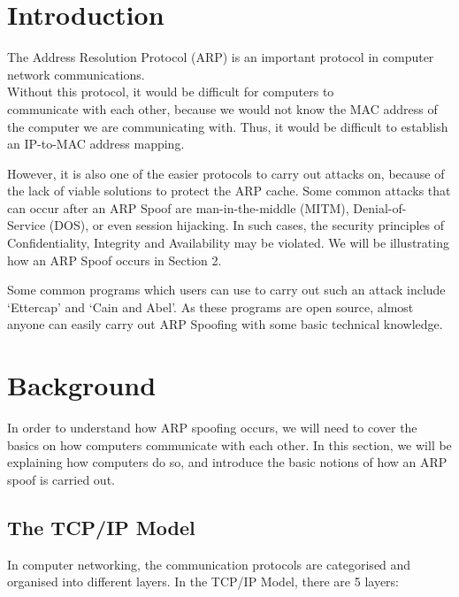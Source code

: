 \documentclass{acm_proc_article-sp}
\begin{document}


\section{Introduction}
The Address Resolution Protocol (ARP) is an important protocol in computer network communications. \\ Without this protocol, it would be difficult for computers to \\communicate with each other, because we would not know the MAC address of the computer we are communicating with. Thus, it would be difficult to establish an IP-to-MAC address mapping.

However, it is also one of the easier protocols to carry out attacks on, because of the lack of viable solutions to protect the ARP cache. Some common attacks that can occur after an ARP Spoof are man-in-the-middle (MITM), Denial-of-\\Service (DOS), or even session hijacking. 
In such cases, the security principles of Confidentiality, Integrity and Availability may be violated. 
We will be illustrating how an ARP Spoof occurs in Section 2. 

Some common programs which users can use to carry out such an attack include `Ettercap' and `Cain and Abel'. As these programs are open source, almost anyone can easily carry out ARP Spoofing with some basic technical knowledge. 

\section{Background}
In order to understand how ARP spoofing occurs, we will need to cover the basics on how computers communicate with each other. In this section, we will be explaining how computers do so, and introduce the basic notions of how an ARP spoof is carried out. 

\subsection{The TCP/IP Model}
In computer networking, the communication protocols are categorised and organised into different layers. In the TCP/IP Model, there are 5 layers: 
\end{document}
